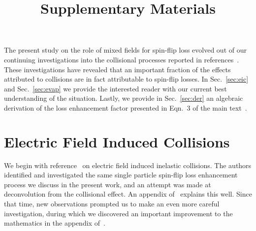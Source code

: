 \documentclass[%
 reprint,
 amsmath,amssymb,
 aps,
pra,
]{revtex4-1}
\begin{document}

\title{Supplementary Materials}%
\maketitle

The present study on the role of mixed fields for spin-flip loss evolved out of our continuing investigations into the collisional processes reported in references~\cite{Stuhl2013,Stuhl2012evap}.
These investigations have revealed that an important fraction of the effects attributed to collisions are in fact attributable to spin-flip losses.
In Sec.~\ref{sec:eic} and Sec.~\ref{sec:evap} we provide the interested reader with our current best understanding of the situation.
Lastly, we provide in Sec.~\ref{sec:der} an algebraic derivation of the loss enhancement factor presented in Eqn.~3 of the main text~\cite{smt}.

\section{Electric Field Induced Collisions\label{sec:eic}}

We begin with reference~\cite{Stuhl2013} on electric field induced inelastic collisions. 
The authors identified and investigated the same single particle spin-flip loss enhancement process we discuss in the present work, and an attempt was made at deconvolution from the collisional effect. 
An appendix of~\cite{Stuhl2013} explains this well.
Since that time, new observations prompted us to make an even more careful investigation, during which we discovered an important improvement to the mathematics in the appendix of~\cite{Stuhl2013}.
\end{document}
